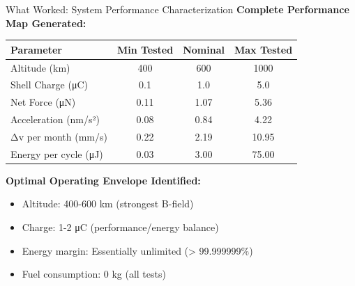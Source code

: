 \documentclass[aspectratio=169]{beamer}
\begin{document}
\begin{frame}{What Worked: System Performance Characterization}
\textbf{Complete Performance Map Generated:}

\vspace{0.5em}
\begin{table}
\footnotesize
\begin{tabular}{lccc}
\toprule
\textbf{Parameter} & \textbf{Min Tested} & \textbf{Nominal} & \textbf{Max Tested} \\
\midrule
Altitude (km) & 400 & 600 & 1000 \\
Shell Charge (μC) & 0.1 & 1.0 & 5.0 \\
Net Force (μN) & 0.11 & 1.07 & 5.36 \\
Acceleration (nm/s²) & 0.08 & 0.84 & 4.22 \\
Δv per month (mm/s) & 0.22 & 2.19 & 10.95 \\
Energy per cycle (μJ) & 0.03 & 3.00 & 75.00 \\
\bottomrule
\end{tabular}
\end{table}

\vspace{1em}
\textbf{Optimal Operating Envelope Identified:}
\begin{itemize}
    \item Altitude: 400-600 km (strongest B-field)
    \item Charge: 1-2 μC (performance/energy balance)
    \item Energy margin: Essentially unlimited (> 99.999999\%)
    \item Fuel consumption: 0 kg (all tests)
\end{itemize}
\end{frame}
\end{document}
